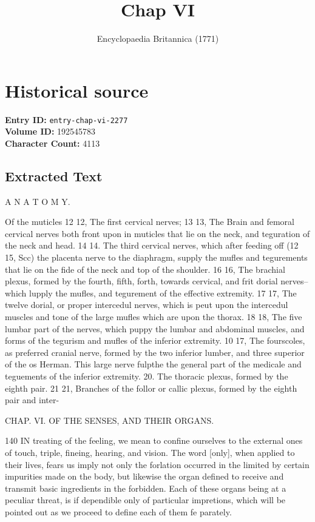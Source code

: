 \documentclass{article}
\title{Chap VI}
\date{Encyclopaedia Britannica (1771)}
\begin{document}
\maketitle

\section*{Historical source}
\textbf{Entry ID:} \texttt{entry-chap-vi-2277} \\
\textbf{Volume ID:} 192545783 \\
\textbf{Character Count:} 4113

\subsection*{Extracted Text}
A N A T O M Y.

Of the muticles 12 12, The first cervical nerves; 13 13, The Brain and femoral cervical nerves both front upon in muticles that lie on the neck, and teguration of the neck and head. 14 14. The third cervical nerves, which after feeding off (12 15, Scc) the placenta nerve to the diaphragm, supply the mufles and tegurements that lie on the fide of the neck and top of the shoulder. 16 16, The brachial plexus, formed by the fourth, fifth, forth, towards cervical, and frit dorial nerves--which lupply the mufles, and tegurement of the effective extremity. 17 17, The twelve dorial, or proper intercedul nerves, which is peut upon the intercedul muscles and tone of the large mufles which are upon the thorax. 18 18, The five lumbar part of the nerves, which puppy the lumbar and abdominal muscles, and forms of the tegurism and mufles of the inferior extremity. 10 17, The fourscoles, as preferred cranial nerve, formed by the two inferior lumber, and three superior of the os Herman. This large nerve fulpthe the general part of the medicale and teguements of the inferior extremity. 20. The thoracic plexus, formed by the eighth pair. 21 21, Branches of the follor or callic plexus, formed by the eighth pair and inter-

CHAP. VI. OF THE SENSES, AND THEIR ORGANS.

140 IN treating of the feeling, we mean to confine ourselves to the external ones of touch, triple, fineing, hearing, and vision. The word [only], when applied to their lives, fears us imply not only the forlation occurred in the limited by certain impurities made on the body, but likewise the organ defined to receive and transmit basic ingredients in the forbidden. Each of these organs being at a peculiar threat, is if dependible only of particular impretions, which will be pointed out as we proceed to define each of them fe parately.
\end{document}
